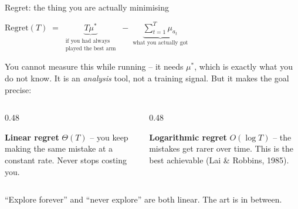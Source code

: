 \documentclass[aspectratio=169]{beamer}
\begin{document}
\begin{frame}{Regret: the thing you are actually minimising}
  \begin{center}
    {\large $\displaystyle \text{Regret}(T) \;=\; \underbrace{T \mu^*}_{\substack{\text{if you had always}\\\text{played the best arm}}}
      \;-\; \underbrace{\textstyle\sum_{t=1}^{T} \mu_{a_t}}_{\text{what you actually got}}$}
  \end{center}

  \vskip 12pt
  \small
  You cannot measure this while running -- it needs $\mu^*$, which is exactly what you do not
  know. It is an \emph{analysis} tool, not a training signal. But it makes the goal precise:

  \vskip 8pt
  \begin{columns}[T]
    \begin{column}{0.48\textwidth}
      \begin{tcolorbox}[colback=armred!8, colframe=armred, boxrule=0.6pt, arc=2pt]
        \small
        \textbf{Linear regret} $\Theta(T)$ -- you keep making the same mistake at a constant
        rate. Never stops costing you.
      \end{tcolorbox}
    \end{column}
    \begin{column}{0.48\textwidth}
      \begin{tcolorbox}[colback=paramgreen!8, colframe=paramgreen, boxrule=0.6pt, arc=2pt]
        \small
        \textbf{Logarithmic regret} $O(\log T)$ -- the mistakes get rarer over time. This is the
        best achievable (Lai \& Robbins, 1985).
      \end{tcolorbox}
    \end{column}
  \end{columns}

  \vskip 10pt
  \begin{center}
    \small
    ``Explore forever'' and ``never explore'' are both linear. The art is in between.
  \end{center}
\end{frame}
\end{document}
